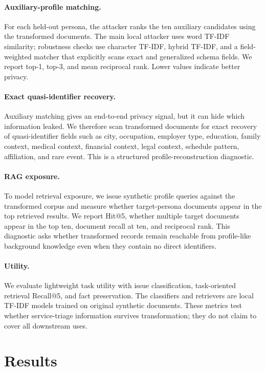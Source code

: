 \documentclass{article}
\begin{document}
\paragraph{Auxiliary-profile matching.}
For each held-out persona, the attacker ranks the ten auxiliary candidates using the transformed documents.
The main local attacker uses word TF-IDF similarity; robustness checks use character TF-IDF, hybrid TF-IDF, and a field-weighted matcher that explicitly scans exact and generalized schema fields.
We report top-1, top-3, and mean reciprocal rank.
Lower values indicate better privacy.

\paragraph{Exact quasi-identifier recovery.}
Auxiliary matching gives an end-to-end privacy signal, but it can hide which information leaked.
We therefore scan transformed documents for exact recovery of quasi-identifier fields such as city, occupation, employer type, education, family context, medical context, financial context, legal context, schedule pattern, affiliation, and rare event.
This is a structured profile-reconstruction diagnostic.

\paragraph{RAG exposure.}
To model retrieval exposure, we issue synthetic profile queries against the transformed corpus and measure whether target-persona documents appear in the top retrieved results.
We report Hit@5, whether multiple target documents appear in the top ten, document recall at ten, and reciprocal rank.
This diagnostic asks whether transformed records remain reachable from profile-like background knowledge even when they contain no direct identifiers.

\paragraph{Utility.}
We evaluate lightweight task utility with issue classification, task-oriented retrieval Recall@5, and fact preservation.
The classifiers and retrievers are local TF-IDF models trained on original synthetic documents.
These metrics test whether service-triage information survives transformation; they do not claim to cover all downstream uses.

\section{Results}
\end{document}
